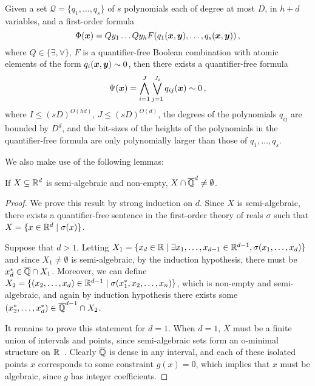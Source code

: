 \begin{theorem}
\label{thm:quant-elim}
Given a set $\mathcal{Q}=\lbrace q_1,\ldots,q_s\rbrace$ of $s$   polynomials each of degree at most $D$, in $h+d$ variables, and a first-order formula
\begin{equation*}
  \Phi(\boldsymbol x)=Q y_1 \ldots Q y_h   F(q_1(\boldsymbol x,\boldsymbol y),\ldots,q_s(\boldsymbol x,\boldsymbol y)) \, ,
\end{equation*}
where $Q\in\lbrace \exists,\forall\rbrace$, $F$ is a quantifier-free Boolean combination with atomic elements of the form $q_i(\boldsymbol x,\boldsymbol y)\sim 0$, then there exists a quantifier-free formula
\begin{equation*}
\Psi(\boldsymbol{x}) = \bigwedge_{i=1}^{J} \bigvee_{j=1}^{J_i} q_{ij}(\boldsymbol{x}) \sim 0 \, ,
\end{equation*}
where $I\leq (sD)^{O(hd)}$, $J\leq (sD)^{O(d)}$, the degrees of the   polynomials $q_{ij}$ are bounded by $D^{d}$, and the bit-sizes of the heights of the polynomials in the quantifier-free formula are only   polynomially larger than those of $q_1,\ldots,q_s$.
\end{theorem}

We also make use of the following lemmas:
\begin{lemma}
  If $X\subseteq\mathbb{R}^{d}$ is semi-algebraic and non-empty,
  $X\cap\overline{\mathbb{Q}}^{d}\neq\emptyset$.
\end{lemma}

\begin{proof}
  We prove this result by strong induction on $d$. Since $X$ is
  semi-algebraic, there exists a quantifier-free sentence in the
  first-order theory of reals $\sigma$ such that $X=\lbrace
  x\in\mathbb{R}^{d}\mid \sigma(x)\rbrace$.

  Suppose that $d>1$. Letting $X_1=\lbrace x_d\in\mathbb{R}\mid
  \exists
  x_1,\ldots,x_{d-1}\in\mathbb{R}^{d-1},\sigma(x_1,\ldots,x_d)\rbrace$
  and since $X_1\neq\emptyset$ is semi-algebraic, by the induction
  hypothesis, there must be $x_d^*\in\overline{\mathbb{Q}}\cap X_1$. Moreover, we
  can define $X_2=\lbrace (x_2,\ldots,x_d)\in\mathbb{R}^{d-1}\mid
  \sigma(x_1^*,x_2,\ldots,x_n)\rbrace$, which is non-empty and
  semi-algebraic, and again by induction hypothesis there exists some
  $(x_2^*,\ldots,x_d^*)\in\overline{\mathbb{Q}}^{d-1}\cap X_2$.

  It remains to prove this statement for $d=1$. When $d=1$, $X$ must
  be a finite union of intervals and points, since semi-algebraic sets
  form an o-minimal structure on $\mathbb{R}$~\cite{Tar51}. Clearly
  $\overline{\mathbb{Q}}$ is dense in any interval, and each of these isolated
  points $x$ corresponds to some constraint $g(x)=0$, which implies
  that $x$ must be algebraic, since $g$ has integer coefficients.
\end{proof}

